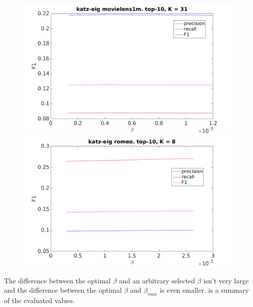 \begin{figure}[h!]
\centering
\begin{minipage}{.5\textwidth}
    \centering
    \includegraphics[width=\linewidth]{fig/katzeig_beta/movielens_katzeig_beta.png}
\end{minipage}%
\begin{minipage}{.5\textwidth}
    \centering
    \includegraphics[width=\linewidth]{fig/katzeig_beta/romeo_katzeig_beta.png}
\end{minipage}
\end{figure}

\FloatBarrier

The difference between the optimal $\beta$ and an arbitrary selected $\beta$ isn't very large and the difference between the optimal $\beta$ and $\beta_{max}$ is even smaller.   is a summary of the evaluated values.



